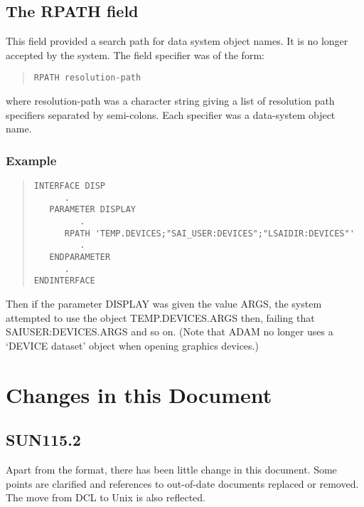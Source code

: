 \documentclass[twoside,11pt]{article}
\newcommand{\xlabel}[1]{}
\renewcommand{\_}{\texttt{\symbol{95}}}
\begin{document}
\subsection{The RPATH field\xlabel{the_rpath_field}}

This field provided a search path for data system object names.
It is no longer accepted by the system.
The field specifier was of the form:
\begin{quote} \begin{verbatim}
RPATH resolution-path
\end{verbatim} \end{quote}
where resolution-path was a character string giving a list of resolution path
specifiers separated by semi-colons.
Each specifier was a data-system object name.

\subsubsection*{Example}
\begin{quote} \begin{verbatim}
INTERFACE DISP
      .
   PARAMETER DISPLAY
         .
      RPATH 'TEMP.DEVICES;"SAI_USER:DEVICES";"LSAIDIR:DEVICES"'
         .
   ENDPARAMETER
      .
ENDINTERFACE
\end{verbatim} \end{quote}
Then if the parameter DISPLAY was given the value ARGS, the system 
attempted to use the object TEMP.DEVICES.ARGS then, failing that 
SAI\_USER:DEVICES.ARGS and so on.
(Note that ADAM no longer uses a `DEVICE dataset' object when opening graphics
devices.)

\newpage
\section{Changes in this Document\xlabel{changes_in_this_document}}
\subsection{SUN115.2}
Apart from the format, there has been little change in this document. 
Some points are clarified and references to out-of-date documents replaced or
removed. The move from DCL to Unix is also reflected.
\end{document}
